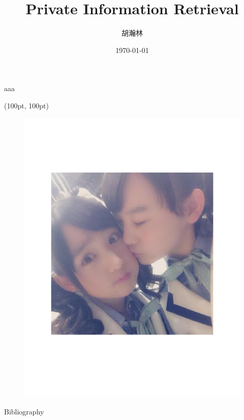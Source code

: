 \documentclass{beamer}
\title{\bfseries Private Information Retrieval}
\author{胡瀚林}
\date{\today}
\begin{document}
\maketitle

\begin{frame}
aaa \cite{heurix_taxonomy_2015}
\end{frame}
\begin{frame}
	\begin{textblock*}{0.4\linewidth}(100pt, 100pt)
    		\begin{figure}
        		\centering
        		\includegraphics[width=0.8\linewidth,bb=0 0 460 460]{./output.pdf}
    		\end{figure}
	\end{textblock*}
\end{frame}
\begin{frame}[t,allowframebreaks]{Bibliography}


\end{frame}
\end{document}
